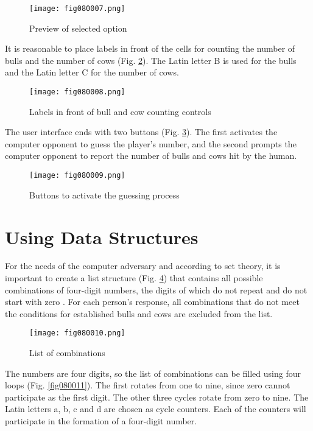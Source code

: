 \begin{figure}[H]
   \centering
   \texttt{[image: fig080007.png]}
   \caption{Preview of selected option}
\label{fig080007}
\end{figure}

It is reasonable to place labels in front of the cells for counting the number of bulls and the number of cows (Fig. \ref{fig080008}). The Latin letter B is used for the bulls and the Latin letter C for the number of cows.

\begin{figure}[H]
   \centering
   \texttt{[image: fig080008.png]}
   \caption{Labels in front of bull and cow counting controls}
\label{fig080008}
\end{figure}

The user interface ends with two buttons (Fig. \ref{fig080009}). The first activates the computer opponent to guess the player's number, and the second prompts the computer opponent to report the number of bulls and cows hit by the human.

\begin{figure}[H]
   \centering
   \texttt{[image: fig080009.png]}
   \caption{Buttons to activate the guessing process}
\label{fig080009}
\end{figure}

\section{Using Data Structures}

For the needs of the computer adversary and according to set theory, it is important to create a list structure (Fig. \ref{fig080010}) that contains all possible combinations of four-digit numbers, the digits of which do not repeat and do not start with zero . For each person's response, all combinations that do not meet the conditions for established bulls and cows are excluded from the list.

\begin{figure}[H]
   \centering
   \texttt{[image: fig080010.png]}
   \caption{List of combinations}
\label{fig080010}
\end{figure}

The numbers are four digits, so the list of combinations can be filled using four loops (Fig. \ref{fig080011}). The first rotates from one to nine, since zero cannot participate as the first digit. The other three cycles rotate from zero to nine. The Latin letters a, b, c and d are chosen as cycle counters. Each of the counters will participate in the formation of a four-digit number.

